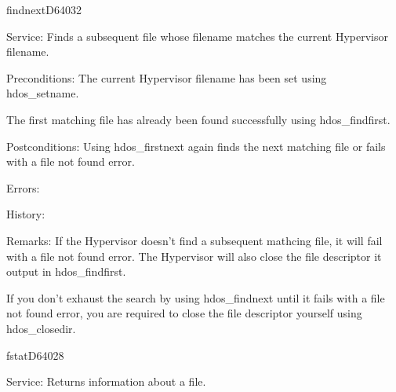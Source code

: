 %
\newpage
\begin{hyppotrap}{findnext}{D640}{32}
\item [Service:]
  Finds a subsequent file whose filename matches the current Hypervisor
  filename.
\item [Preconditions:]
  The current Hypervisor filename has been set using hdos\_setname.

  The first matching file has already been found successfully using
  hdos\_findfirst.
\item [Postconditions:]
  Using hdos\_firstnext again finds the next matching file or fails with a file
  not found error.
\item [Errors:]
\item [History:]
\item [Remarks:]
  If the Hypervisor doesn't find a subsequent mathcing file, it will fail with a
  file not found error. The Hypervisor will also close the file descriptor it
  output in hdos\_findfirst.

  If you don't exhaust the search by using hdos\_findnext until it fails with a
  file not found error, you are required to close the file descriptor yourself
  using hdos\_closedir.
\end{hyppotrap}


\newpage
\begin{hyppotrap}{fstat}{D640}{28}
\item [Service:]
  Returns information about a file.
\notimplemented
\end{hyppotrap}


